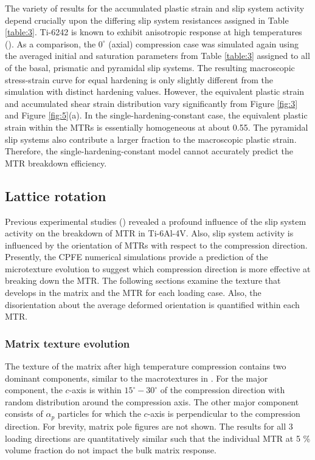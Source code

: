 \documentclass[review]{elsarticle}
\begin{document}
The variety of results for the accumulated plastic strain and slip system activity depend crucially upon the differing slip system resistances assigned in Table \ref{table:3}.
Ti-6242 is known to exhibit anisotropic response at high temperatures (\cite{r27}).
As a comparison, the $0^{\circ}$ (axial) compression case was simulated again using the averaged initial and saturation parameters from Table \ref{table:3} assigned to all of the basal, prismatic and pyramidal slip systems.
The resulting macroscopic stress-strain curve for equal hardening is only slightly different from the simulation with distinct hardening values.
However, the equivalent plastic strain and accumulated shear strain distribution vary significantly from Figure \ref{fig:3} and Figure \ref{fig:5}(a).
In the single-hardening-constant case, the equivalent plastic strain within the MTRs is essentially homogeneous at about 0.55.
The pyramidal slip systems also contribute a larger fraction to the macroscopic plastic strain.
Therefore, the single-hardening-constant model cannot accurately predict the MTR breakdown efficiency.
	\subsection{Lattice rotation}
	Previous experimental studies (\cite{r13}) revealed a profound influence of the slip system activity on the breakdown of MTR in Ti-6Al-4V.
	Also, slip system activity is influenced by the orientation of MTRs with respect to the compression direction.
	Presently, the CPFE numerical simulations provide a prediction of the microtexture evolution to suggest which compression direction is more effective at breaking down the MTR.
	The following sections examine the texture that develops in the matrix and the MTR for each loading case.
	Also, the disorientation about the average deformed orientation is quantified within each MTR.
		\subsubsection{Matrix texture evolution}
		The texture of the matrix after high temperature compression contains two dominant components, similar to the macrotextures in \cite{r29,r30}.
		For the major component, the $c$-axis is within $15^{\circ}-30^{\circ}$ of the compression direction with random distribution around the compression axis.
		The other major component consists of $\alpha_p$ particles for which the $c$-axis is perpendicular to the compression direction.
		For brevity, matrix pole figures are not shown.
		The results for all 3 loading directions are quantitatively similar such that the individual MTR at 5 \% volume fraction do not impact the bulk matrix response.
\end{document}
